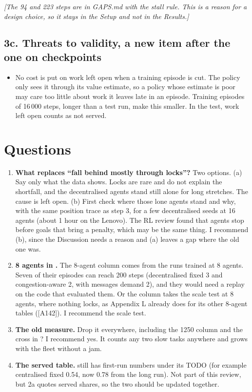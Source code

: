 \documentclass[11pt,a4paper]{article}
\newcommand{\new}[1]{\textcolor{newc}{#1}}
\newcommand{\note}[1]{{\small\itshape [#1]}}
\newcommand{\lab}[1]{\textsf{\footnotesize\detokenize{#1}}}
\begin{document}
\note{The 94 and 223 steps are in GAPS.md with the stall rule. This is a reason
for a design choice, so it stays in the Setup and not in the Results.}

\subsection*{3c. Threats to validity, a new item after the one on checkpoints}

\begin{itemize}\item \new{No cost is put on work left open when a training episode is cut.
The policy only sees it through its value estimate, so a policy whose estimate
is poor may care too little about work it leaves late in an episode. Training
episodes of 16\,000 steps, longer than a test run, make this smaller. In the
test, work left open counts as not served.}
\end{itemize}

\section*{Questions}
\begin{enumerate}
  \item \textbf{What replaces ``fall behind mostly through locks''?} Two
    options.
    (a) Say only what the data shows. Locks are rare and do not explain
    the shortfall, and the decentralised agents stand still alone for long
    stretches. The cause is left open.
    (b) First check where those lone agents stand and why, with the same
    position trace as step 3, for a few decentralised seeds at 16 agents
    (about 1 hour on the Lenovo). The RL review found that agents stop
    before goals that bring a penalty, which may be the same thing.
    I recommend (b), since the Discussion needs a reason and (a) leaves a
    gap where the old one was.
  \item \textbf{8 agents in \lab{tab:app:locks}.} The 8-agent column comes
    from the runs trained at 8 agents. Seven of their episodes can reach 200
    steps (decentralised fixed 3 and congestion-aware 2, with messages
    demand 2), and they would need a replay on the code that evaluated
    them. Or the column takes the scale test at 8 agents, where nothing
    locks, as Appendix L already does for its other 8-agent tables
    ([A142]). I recommend the scale test.
  \item \textbf{The old measure.} Drop it everywhere, including the 1250
    column and the cross in \lab{fig:exp:seeds}? I recommend yes. It counts
    any two slow tasks anywhere and grows with the fleet without a jam.
  \item \textbf{The served table.} \lab{tab:exp:served} still has first-run
    numbers under its TODO (for example centralised fixed 0.54, now 0.78
    from the long run). Not part of this review, but 2a quotes served
    shares, so the two should be updated together.
\end{enumerate}
\end{document}
